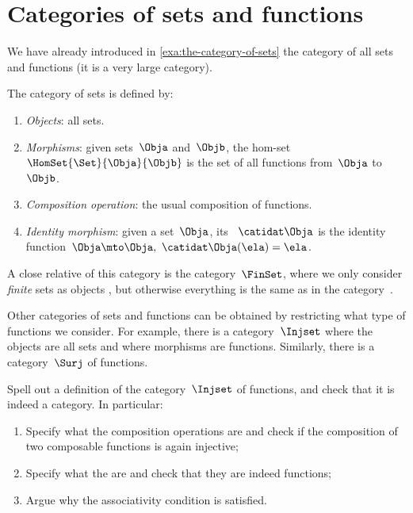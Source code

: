 
\section{Categories of sets and functions}

We have already introduced in \cref{exa:the-category-of-sets} the category of all sets and functions (it is a very large category).

\begin{ctdefinition}
    \label{def:Set}
    The category of sets \Set is defined by:
    \begin{enumerate}
        \item \emph{Objects}: all sets.
        \item \emph{Morphisms}: given sets~$\Obja$ and~$\Objb$, the hom-set~$\HomSet{\Set}{\Obja}{\Objb}$ is the set of all functions from~$\Obja$ to~$\Objb$.
        \item \emph{Composition operation}: the usual composition of functions.
        \item \emph{Identity morphism}: given a set~$\Obja$, its ~$\catidat\Obja$ is the identity function~$\Obja \mto \Obja, \ \catidat\Obja(\ela) = \ela$.
    \end{enumerate}
\end{ctdefinition}

A close relative of this category is the category~$\FinSet$, where we only consider \emph{finite} sets as objects , but otherwise everything is the same as in the category~\Set.

Other categories of sets and functions can be obtained by restricting what type of functions we consider.
For example, there is a category~$\Injset$ where the objects are all sets and where morphisms are  functions.
Similarly, there is a category~$\Surj$ of  functions.

\begin{exercise}
    Spell out a definition of the category~$\Injset$ of  functions, and check that it is indeed a category.
    In particular:
    \begin{enumerate}
        \item Specify what the composition operations are and check if the composition of two composable  functions is again injective;
        \item Specify what the    are and check that they are indeed  functions;
        \item Argue why the associativity condition is satisfied.
    \end{enumerate}
\end{exercise}

